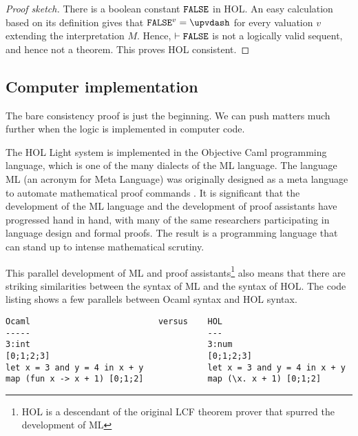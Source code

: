 \documentclass[brochure,english,12pt]{bourbaki}
\theoremstyle{plain}
\def\op#1{{\operatorname{#1}}}
\begin{document}
\begin{proof}[Proof sketch]
There is a boolean constant $\op{\tt FALSE}$ in HOL.
An easy calculation based on its definition gives that $\op{\tt FALSE}^v = \upvdash$ for every valuation $v$
extending the interpretation $M$.  Hence,
$\vdash \op{\tt FALSE}$ is not a logically valid sequent, and hence not a theorem.
This proves HOL consistent.
\end{proof}

\subsection{Computer implementation}

The bare consistency proof is just the beginning.  We can push matters  much further when
the logic is implemented in computer code.

The HOL Light system is implemented in the Objective Caml programming language, which is one of the many dialects of the ML
language.  The language ML (an acronym for Meta Language) was originally designed as a
meta language to automate mathematical proof commands \cite{Gor}.  It is significant that the development
of the ML language and the development of proof assistants have progressed hand in hand, with many
of the same researchers participating in language design and formal proofs.  
The result is a programming language that can stand up to intense mathematical scrutiny.

This parallel development of ML and proof assistants\footnote{HOL is a descendant of the original LCF theorem prover that
spurred the development of ML} also means that there are striking similarities between
the syntax of ML and the syntax of HOL.    The code listing shows a few parallels between Ocaml syntax and
HOL syntax.

\begin{lstlisting}[keepspaces=true,stringstyle=\tt,basicstyle=\small,frame=single,framesep=8pt,mathescape,morekeywords={type,let,and,in,Ocaml,HOL},columns=flexible]
Ocaml                          versus    HOL
-----                                    ---
3:int                                    3:num
[0;1;2;3]                                [0;1;2;3]  
let x = 3 and y = 4 in x + y             let x = 3 and y = 4 in x + y
map (fun x -> x + 1) [0;1;2]             map (\x. x + 1) [0;1;2]
\end{lstlisting}


\end{document}
